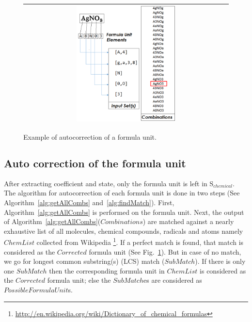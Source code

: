 \documentclass[oneside,a4paper,12pt]{book}
\begin{document}
\begin{figure}[h]
\center\ 
\begin{tabular}{|c|} 
\hline
\includegraphics[width=0.5\textwidth]{autoCorrectionPictorial.png}\\
\hline
\end{tabular} 
\caption{Example of autocorrection of a formula unit. }
\label{autoCorrection} 
\end{figure} 





\subsection{Auto correction of the formula unit}

After extracting coefficient and state, only the formula unit is left in S$_{chemical}$. 
The algorithm for autocorrection of each formula unit is done in two steps (See Algorithm~\ref{alg:getAllCombs} and~\ref{alg:findMatch}). First, Algorithm~\ref{alg:getAllCombs} is performed on the formula unit.
 Next, the output of Algorithm~\ref{alg:getAllCombs}($Combinations$) are matched against a nearly exhaustive list of all molecules, chemical compounds, radicals and atoms namely $ChemList$ collected from Wikipedia \footnote{\url{http://en.wikipedia.org/wiki/Dictionary_of_chemical_formulas}}.
If a perfect match is found, that match is considered as the $Corrected$ formula unit (See Fig.~\ref{autoCorrection}). But in case of no match, we go for
longest common substring(s) (LCS) match ($SubMatch$).
If there is only one $SubMatch$ then the corresponding formula unit in $ChemList$ is considered as the $Corrected$  formula unit; else the $SubMatch$es are considered as $PossibleFormulaUnit$s. 
\end{document}
